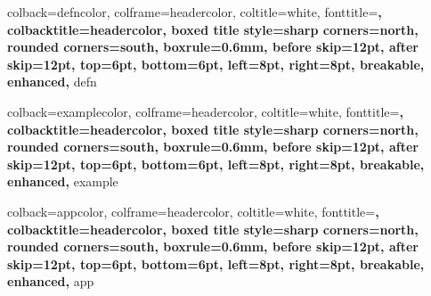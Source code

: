 {colback=defncolor,        %
 colframe=headercolor,     %
 coltitle=white,           %
 fonttitle=\bfseries,      %
 colbacktitle=headercolor, %
 boxed title style={sharp corners=north, rounded corners=south},
 boxrule=0.6mm,            %
 before skip=12pt, after skip=12pt, %
 top=6pt, bottom=6pt, %
 left=8pt, right=8pt, %
 breakable,                %
 enhanced,                 %
}{defn}

{colback=examplecolor,        %
 colframe=headercolor,        %
 coltitle=white,              %
 fonttitle=\bfseries,         %
 colbacktitle=headercolor,    %
 boxed title style={sharp corners=north, rounded corners=south},
 boxrule=0.6mm,               %
 before skip=12pt, after skip=12pt, %
 top=6pt, bottom=6pt, %
 left=8pt, right=8pt, %
 breakable,                 %
 enhanced,                  %
}{example}

{colback=appcolor,        %
 colframe=headercolor,     %
 coltitle=white,           %
 fonttitle=\bfseries,      %
 colbacktitle=headercolor, %
 boxed title style={sharp corners=north, rounded corners=south},
 boxrule=0.6mm,            %
 before skip=12pt, after skip=12pt, %
 top=6pt, bottom=6pt,      %
 left=8pt, right=8pt,      %
 breakable,                %
 enhanced,                 %
}{app}


